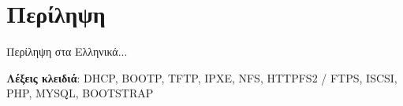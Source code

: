 \chapter*{Περίληψη}
Περίληψη στα Ελληνικά...

\vfill
\textbf{Λέξεις κλειδιά}: DHCP, BOOTP, TFTP, IPXE, NFS, HTTPFS2 / FTPS, ISCSI, PHP, MYSQL, BOOTSTRAP